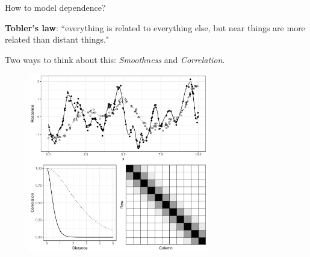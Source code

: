 \documentclass{beamer}
\begin{document}
\begin{frame}{How to model dependence?} 

\textbf{Tobler's law}: ``everything is related to everything else, but near things are more related than distant things."

Two ways to think about this: \textit{Smoothness} and \textit{Correlation}. 

  \begin{figure}[h]
    \begin{center}
      \includegraphics[width=0.7\textwidth, trim={0 9cm 0 0}, clip]{figures/smooth_corr.pdf}
    \end{center}
  \end{figure}

\end{frame}
\end{document}
